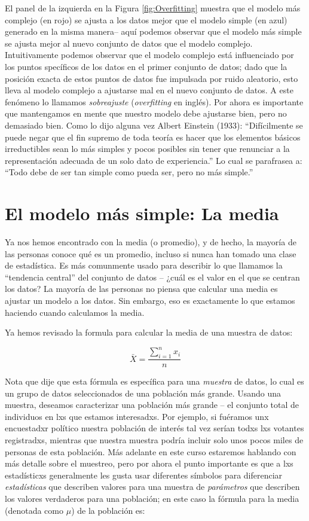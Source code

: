 \documentclass[
  12pt,
]{book}
\theoremstyle{definition}
\theoremstyle{definition}
\theoremstyle{definition}
\theoremstyle{remark}
\begin{document}
El panel de la izquierda en la Figura \ref{fig:Overfitting} muestra que el modelo más complejo (en rojo) se ajusta a los datos mejor que el modelo simple (en azul) generado en la misma manera-- aquí podemos observar que el modelo más simple se ajusta mejor al nuevo conjunto de datos que el modelo complejo. Intuitivamente podemos observar que el modelo complejo está influenciado por los puntos specíficos de los datos en el primer conjunto de datos; dado que la posición exacta de estos puntos de datos fue impulsada por ruido aleatorio, esto lleva al modelo complejo a ajustarse mal en el nuevo conjunto de datos. A este fenómeno lo llamamos \emph{sobreajuste} (\emph{overfitting} en inglés). Por ahora es importante que mantengamos en mente que nuestro modelo debe ajustarse bien, pero no demasiado bien. Como lo dijo alguna vez Albert Einstein (1933): ``Difícilmente se puede negar que el fin supremo de toda teoría es hacer que los elementos básicos irreductibles sean lo más simples y pocos posibles sin tener que renunciar a la representación adecuada de un solo dato de experiencia.'' Lo cual se parafrasea a: ``Todo debe de ser tan simple como pueda ser, pero no más simple.''

\hypertarget{el-modelo-muxe1s-simple-la-media}{%
\section{El modelo más simple: La media}\label{el-modelo-muxe1s-simple-la-media}}

Ya nos hemos encontrado con la media (o promedio), y de hecho, la mayoría de las personas conoce qué es un promedio, incluso si nunca han tomado una clase de estadística. Es más comunmente usado para describir lo que llamamos la ``tendencia central'' del conjunto de datos -- ¿cuál es el valor en el que se centran los datos? La mayoría de las personas no piensa que calcular una media es ajustar un modelo a los datos. Sin embargo, eso es exactamente lo que estamos haciendo cuando calculamos la media.

Ya hemos revisado la formula para calcular la media de una muestra de datos:

\[
\bar{X} = \frac{\sum_{i=1}^{n}x_i}{n}
\]

Nota que dije que esta fórmula es específica para una \emph{muestra} de datos, lo cual es un grupo de datos seleccionados de una población más grande. Usando una muestra, deseamos caracterizar una población más grande -- el conjunto total de individuos en lxs que estamos interesadxs. Por ejemplo, si fuéramos unx encuestadxr político nuestra población de interés tal vez serían todxs lxs votantes registradxs, mientras que nuestra muestra podría incluir solo unos pocos miles de personas de esta población. Más adelante en este curso estaremos hablando con más detalle sobre el muestreo, pero por ahora el punto importante es que a lxs estadísticxs generalmente les gusta usar diferentes símbolos para diferenciar \emph{estadísticas} que describen valores para una muestra de \emph{parámetros} que describen los valores verdaderos para una población; en este caso la fórmula para la media (denotada como \(\mu\)) de la población es:
\end{document}
